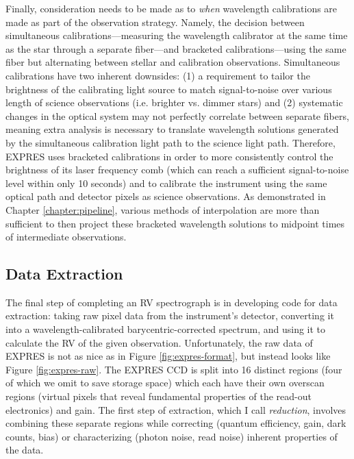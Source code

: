 Finally, consideration needs to be made as to \textit{when} wavelength calibrations are made as part of the observation strategy. Namely, the decision between simultaneous calibrations---measuring the wavelength calibrator at the same time as the star through a separate fiber---and bracketed calibrations---using the same fiber but alternating between stellar and calibration observations. Simultaneous calibrations have two inherent downsides: (1) a requirement to tailor the brightness of the calibrating light source to match signal-to-noise over various length of science observations (i.e. brighter vs. dimmer stars) and (2) systematic changes in the optical system may not perfectly correlate between separate fibers, meaning extra analysis is necessary to translate wavelength solutions generated by the simultaneous calibration light path to the science light path. Therefore, EXPRES uses bracketed calibrations in order to more consistently control the brightness of its laser frequency comb (which can reach a sufficient signal-to-noise level within only 10 seconds) and to calibrate the instrument using the same optical path and detector pixels as science observations. As demonstrated in Chapter \ref{chapter:pipeline}, various methods of interpolation are more than sufficient to then project these bracketed wavelength solutions to midpoint times of intermediate observations.

\subsection{Data Extraction} \label{intro:extraction}

The final step of completing an RV spectrograph is in developing code for data extraction: taking raw pixel data from the instrument's detector, converting it into a wavelength-calibrated barycentric-corrected spectrum, and using it to calculate the RV of the given observation. Unfortunately, the raw data of EXPRES is not as nice as in Figure \ref{fig:expres-format}, but instead looks like Figure \ref{fig:expres-raw}. The EXPRES CCD is split into 16 distinct regions (four of which we omit to save storage space) which each have their own overscan regions (virtual pixels that reveal fundamental properties of the read-out electronics) and gain. The first step of extraction, which I call \textit{reduction}, involves combining these separate regions while correcting (quantum efficiency, gain, dark counts, bias) or characterizing (photon noise, read noise) inherent properties of the data.

